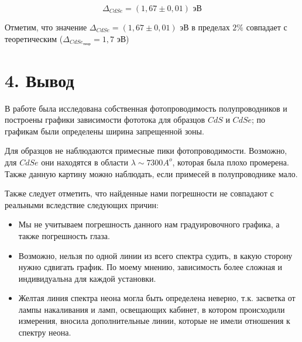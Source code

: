 \documentclass[a4paper,12pt]{report}
\begin{document}
  \begin{equation*}
     \Delta_{CdSe} = (1,67 \pm 0,01) \text{ эВ} 
 \end{equation*}

 Отметим, что значение $\Delta_{CdSe} = (1,67 \pm 0,01) \text{ эВ}$ в пределах $2\%$ совпадает с теоретическим ($\Delta_{CdSe_{\text{теор}}} = 1,7 $ эВ)

\section*{4. Вывод}

В работе была исследована собственная фотопроводимость полупроводников и построены графики зависимости фототока для образцов $CdS$ и $CdSe$; по графикам были определены ширина запрещенной зоны. 

Для образцов не наблюдаются примесные пики фотопроводимости. Возможно, для $CdSe$ они находятся в области $\lambda \sim 7300 A^{o}$, которая была плохо промерена. Также данную картину можно наблюдать, если примесей в полупроводнике мало.

Также следует отметить, что найденные нами погрешности не совпадают с реальными вследствие следующих причин:
\begin{itemize}
    \item Мы не учитываем погрешность данного нам градуировочного графика, а также погрешность глаза.
    \item Возможно, нельзя по одной линии из всего спектра судить, в какую сторону нужно сдвигать график. По моему мнению, зависимость более сложная и индивидуальна для каждой установки.
    \item Желтая линия спектра неона могла быть определена неверно, т.к. засветка от лампы накаливания и ламп, освещающих кабинет, в котором происходили измерения, вносила дополнительные линии, которые не имели отношения к спектру неона.
\end{itemize}
\end{document}
